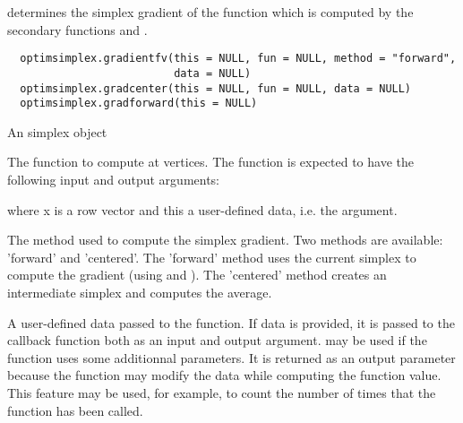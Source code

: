 %
\begin{Description}\relax
{} determines the simplex gradient of the function
which is computed by the secondary functions 
and .
\end{Description}
%
\begin{Usage}
\begin{verbatim}
  optimsimplex.gradientfv(this = NULL, fun = NULL, method = "forward",
                          data = NULL)
  optimsimplex.gradcenter(this = NULL, fun = NULL, data = NULL)
  optimsimplex.gradforward(this = NULL)
\end{verbatim}
\end{Usage}
%
\begin{Arguments}
\begin{ldescription}
\item[\code{this}] An simplex object
\item[\code{fun}] The function to compute at vertices. The function is expected to
have the following input and output arguments:

where x is a row vector and this a user-defined data, i.e. the 
argument.
\item[\code{method}] The method used to compute the simplex gradient. Two methods
are available: 'forward' and 'centered'. The 'forward' method uses the
current simplex to compute the gradient (using 
and  ). The 'centered' method creates an
intermediate simplex and computes the average.
\item[\code{data}] A user-defined data passed to the function. If data is provided,
it is passed to the callback function both as an input and output argument.
 may be used if the function uses some additionnal parameters. It
is returned as an output parameter because the function may modify the data
while computing the function value. This feature may be used, for example,
to count the number of times that the function has been called.
\end{ldescription}
\end{Arguments}
